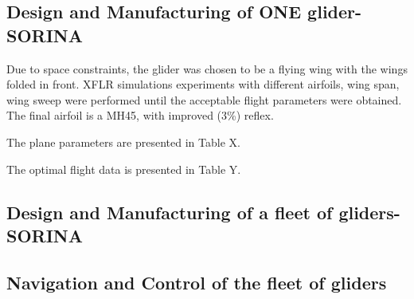 \subsection{Design and Manufacturing of ONE glider-SORINA}

Due to space constraints, the glider was chosen to be a flying wing with the wings folded in front. XFLR simulations experiments with different airfoils, wing span, wing sweep were performed until the acceptable flight parameters were obtained. The final airfoil is a MH45, with improved (3\%) reflex.

The plane parameters are presented in Table X.


The optimal flight data is presented in Table Y.


\subsection{Design and Manufacturing of a fleet of gliders-SORINA}

\subsection{Navigation and Control of the fleet of gliders}
\label{subsection:navcontrol}

